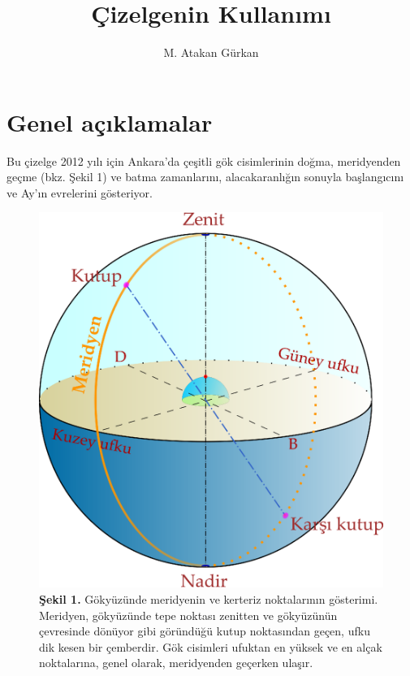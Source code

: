 \documentclass[12pt]{article}
\author{M. Atakan Gürkan}
\title{Çizelgenin Kullanımı}
\date{}
\begin{document}
\maketitle
\section{Genel açıklamalar}
Bu çizelge 2012 yılı için Ankara'da çeşitli gök cisimlerinin doğma,
meridyenden geçme (bkz. Şekil 1) ve batma zamanlarını,
alacakaranlığın sonuyla başlangıcını ve Ay'ın evrelerini gösteriyor.
\begin{figure}
  \label{fig:meridyen}
  \begin{center}
    \begin{minipage}[t]{0.6\textwidth}
\includegraphics[width=\textwidth]{Meridyen}
    \end{minipage}\hfill
    \begin{minipage}[b]{0.38\textwidth}
\caption*{\textbf{Şekil 1.} Gökyüzünde meridyenin ve kerteriz noktalarının gösterimi. Meridyen,
gökyüzünde tepe noktası zenitten ve gökyüzünün çev\-re\-sin\-de dönüyor gibi
göründüğü kutup noktasından geçen, ufku dik kesen bir çemberdir. Gök
cisimleri ufuktan en yüksek ve en alçak noktalarına, genel olarak,
meridyenden geçerken ulaşır.}
    \end{minipage}
  \end{center}
\end{figure}
\end{document}
